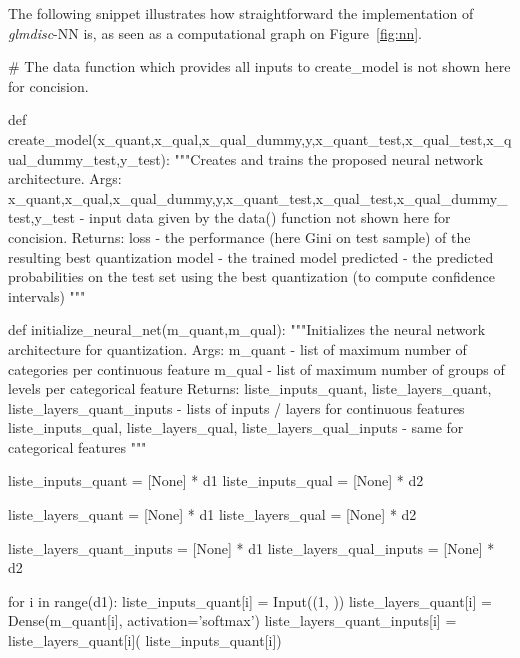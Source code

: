 
The following snippet illustrates how straightforward the implementation of \textit{glmdisc}-NN is, as seen as a computational graph on Figure~\ref{fig:nn}.

\begin{pylisting}
# The data function which provides all inputs to create_model is not shown here for concision.

def create_model(x_quant,x_qual,x_qual_dummy,y,x_quant_test,x_qual_test,x_qual_dummy_test,y_test):
    """Creates and trains the proposed neural network architecture.
    Args:
       x_quant,x_qual,x_qual_dummy,y,x_quant_test,x_qual_test,x_qual_dummy_test,y_test - input data given by the data() function not shown here for concision.
    Returns:
       loss - the performance (here Gini on test sample) of the resulting best quantization
       model - the trained model
       predicted - the predicted probabilities on the test set using the best quantization (to compute confidence intervals)
    """
    
    def initialize_neural_net(m_quant,m_qual):
        """Initializes the neural network architecture for quantization.
	    Args:
	       m_quant - list of maximum number of categories per continuous feature
	       m_qual - list of maximum number of groups of levels per categorical feature
	    Returns:
            liste_inputs_quant, liste_layers_quant, liste_layers_quant_inputs - lists of inputs / layers for continuous features
            liste_inputs_qual, liste_layers_qual, liste_layers_qual_inputs - same for categorical features
	    """
	    
        liste_inputs_quant = [None] * d1
        liste_inputs_qual = [None] * d2

        liste_layers_quant = [None] * d1
        liste_layers_qual = [None] * d2

        liste_layers_quant_inputs = [None] * d1
        liste_layers_qual_inputs = [None] * d2

        for i in range(d1):
            liste_inputs_quant[i] = Input((1, ))
            liste_layers_quant[i] = Dense(m_quant[i], activation='softmax')
            liste_layers_quant_inputs[i] = liste_layers_quant[i](
                liste_inputs_quant[i])


\end{pylisting}
